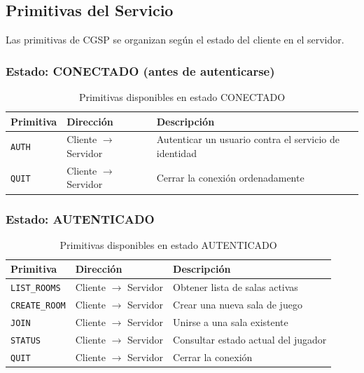 \documentclass[12pt, letterpaper]{article}
\begin{document}
\subsection{Primitivas del Servicio}

Las primitivas de CGSP se organizan según el estado del cliente en el servidor.

\subsubsection{Estado: CONECTADO (antes de autenticarse)}

\begin{table}[H]
\centering
\begin{tabularx}{\textwidth}{l l X}
\toprule
\textbf{Primitiva} & \textbf{Dirección} & \textbf{Descripción} \\
\midrule
\texttt{AUTH} & Cliente $\rightarrow$ Servidor & Autenticar un usuario contra el servicio de identidad \\
\texttt{QUIT} & Cliente $\rightarrow$ Servidor & Cerrar la conexión ordenadamente \\
\bottomrule
\end{tabularx}
\caption{Primitivas disponibles en estado CONECTADO}
\end{table}

\subsubsection{Estado: AUTENTICADO}

\begin{table}[H]
\centering
\begin{tabularx}{\textwidth}{l l X}
\toprule
\textbf{Primitiva} & \textbf{Dirección} & \textbf{Descripción} \\
\midrule
\texttt{LIST\_ROOMS}  & Cliente $\rightarrow$ Servidor & Obtener lista de salas activas \\
\texttt{CREATE\_ROOM} & Cliente $\rightarrow$ Servidor & Crear una nueva sala de juego \\
\texttt{JOIN}         & Cliente $\rightarrow$ Servidor & Unirse a una sala existente \\
\texttt{STATUS}       & Cliente $\rightarrow$ Servidor & Consultar estado actual del jugador \\
\texttt{QUIT}         & Cliente $\rightarrow$ Servidor & Cerrar la conexión \\
\bottomrule
\end{tabularx}
\caption{Primitivas disponibles en estado AUTENTICADO}
\end{table}
\end{document}
